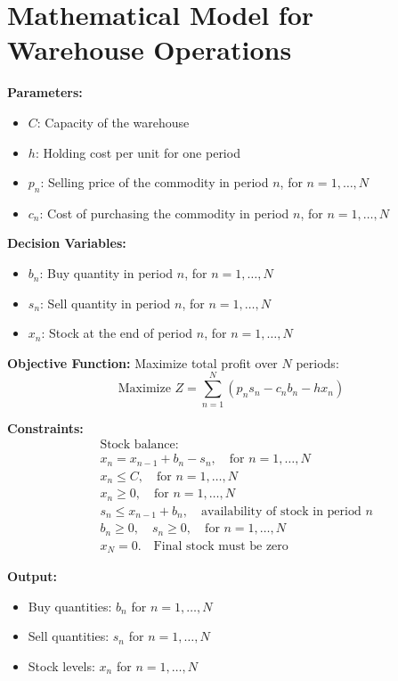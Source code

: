 \documentclass{article}
\begin{document}
\section*{Mathematical Model for Warehouse Operations}

\textbf{Parameters:}
\begin{itemize}
    \item $C$: Capacity of the warehouse
    \item $h$: Holding cost per unit for one period
    \item $p_n$: Selling price of the commodity in period $n$, for $n = 1, \ldots, N$
    \item $c_n$: Cost of purchasing the commodity in period $n$, for $n = 1, \ldots, N$
\end{itemize}

\textbf{Decision Variables:}
\begin{itemize}
    \item $b_n$: Buy quantity in period $n$, for $n = 1, \ldots, N$
    \item $s_n$: Sell quantity in period $n$, for $n = 1, \ldots, N$
    \item $x_n$: Stock at the end of period $n$, for $n = 1, \ldots, N$
\end{itemize}

\textbf{Objective Function:}
Maximize total profit over $N$ periods:
\[
\text{Maximize } Z = \sum_{n=1}^{N} (p_n s_n - c_n b_n - h x_n)
\]

\textbf{Constraints:}
\begin{align*}
    & \text{Stock balance:} \\
    & x_n = x_{n-1} + b_n - s_n, \quad \text{for } n = 1, \ldots, N \\
    & x_n \leq C, \quad \text{for } n = 1, \ldots, N \\
    & x_n \geq 0, \quad \text{for } n = 1, \ldots, N \\
    & s_n \leq x_{n-1} + b_n, \quad \text{availability of stock in period } n \\
    & b_n \geq 0, \quad s_n \geq 0, \quad \text{for } n = 1, \ldots, N \\
    & x_N = 0. \quad \text{Final stock must be zero}
\end{align*}

\textbf{Output:}
\begin{itemize}
    \item Buy quantities: $b_n$ for $n = 1, \ldots, N$
    \item Sell quantities: $s_n$ for $n = 1, \ldots, N$
    \item Stock levels: $x_n$ for $n = 1, \ldots, N$
\end{itemize}
\end{document}
